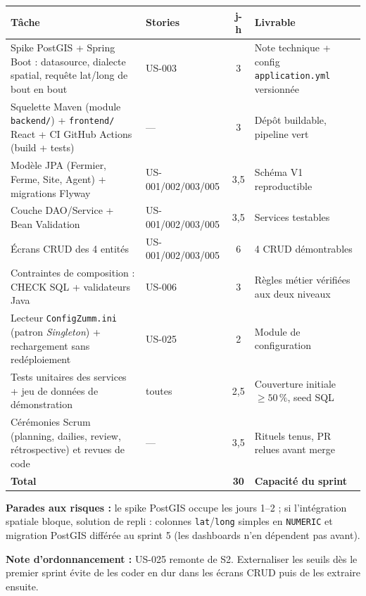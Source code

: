 \begin{center}
\small
\begin{tabular}{p{7.2cm}lcp{4.6cm}}
\toprule
\textbf{Tâche} & \textbf{Stories} & \textbf{j-h} & \textbf{Livrable} \\
\midrule
Spike PostGIS + Spring Boot : datasource, dialecte spatial, requête
lat/long de bout en bout & US-003 & 3 & Note technique + config
\texttt{application.yml} versionnée \\
Squelette Maven (module \texttt{backend/}) + \texttt{frontend/} React + CI
GitHub Actions (build + tests) & --- & 3 & Dépôt buildable, pipeline vert \\
Modèle JPA (Fermier, Ferme, Site, Agent) + migrations Flyway & US-001/002/003/005 & 3,5 & Schéma V1 reproductible \\
Couche DAO/Service + Bean Validation & US-001/002/003/005 & 3,5 & Services testables \\
Écrans CRUD des 4 entités & US-001/002/003/005 & 6 & 4 CRUD démontrables \\
Contraintes de composition : CHECK SQL + validateurs Java & US-006 & 3 & Règles métier vérifiées aux deux niveaux \\
Lecteur \texttt{ConfigZumm.ini} (patron \emph{Singleton}) +
rechargement sans redéploiement & US-025 & 2 & Module de configuration \\
Tests unitaires des services + jeu de données de démonstration & toutes & 2,5 & Couverture initiale $\geq 50\,\%$, seed SQL \\
\addlinespace
Cérémonies Scrum (planning, dailies, review, rétrospective) et
revues de code & --- & 3,5 & Rituels tenus, PR relues avant merge \\
\midrule
\textbf{Total} & & \textbf{30} & \textbf{Capacité du sprint} \\
\bottomrule
\end{tabular}
\end{center}

\textbf{Parades aux risques :} le spike PostGIS occupe les jours 1--2 ; si
l'intégration spatiale bloque, solution de repli : colonnes
\texttt{lat}/\texttt{long} simples en \texttt{NUMERIC} et migration PostGIS
différée au sprint 5 (les dashboards n'en dépendent pas avant).

\textbf{Note d'ordonnancement :} US-025 remonte de S2. Externaliser les
seuils dès le premier sprint évite de les coder en dur dans les écrans CRUD
puis de les extraire ensuite.

